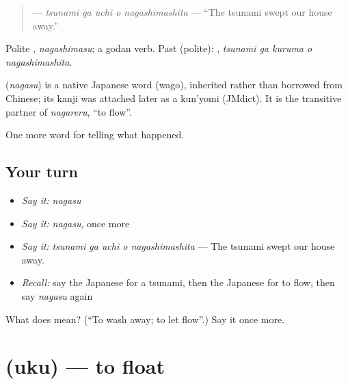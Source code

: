 \begin{quote}
\textbf{  } — \emph{tsunami ga uchi o nagashimashita} — \textquotedblleft{}The tsunami swept our house away.\textquotedblright{}
\end{quote}

Polite \textbf{}, \emph{nagashimasu}; a godan verb. Past (polite): \textbf{  }, \emph{tsunami ga kuruma o nagashimashita}.

\begin{cousinweb}
\textbf{} (\emph{nagasu}) is a native Japanese word (wago), inherited rather than borrowed from Chinese; its kanji was attached later as a kun'yomi (JMdict). It is the transitive partner of \emph{nagareru}, \textquotedblleft{}to flow\textquotedblright{}.
\end{cousinweb}

\begin{grammarlens}[title={What you've built}]
One more word for telling what happened.
\end{grammarlens}

\subsection*{Your turn}
\begin{itemize}
\raggedright
  \item \emph{Say it:} \emph{nagasu}
  \item \emph{Say it:} \emph{nagasu}, once more
  \item \emph{Say it:} \emph{tsunami ga uchi o nagashimashita} — The tsunami swept our house away.
  \item \emph{Recall:} say the Japanese for a tsunami, then the Japanese for to flow, then say \emph{nagasu} again
\end{itemize}

\begin{tcolorbox}[breakable,colback=teal!4,colframe=teal!35!black,title={Before you move on}]
What does  mean? (\textquotedblleft{}To wash away; to let flow\textquotedblright{}.) Say it once more.
\end{tcolorbox}
\section[\texorpdfstring{\ja{うく} (uku)}{うく (uku)}]{ (uku) — to float}

\label{lesson:JA-C275-uku}



